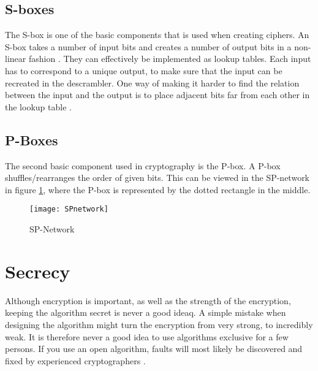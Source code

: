 \subsection{S-boxes}
The S-box is one of the basic components that is used when creating ciphers. 
An S-box takes a number of input bits and creates a number of output bits in 
a non-linear fashion \citep[pp. 74--75]{Stinson:2006}. They can effectively be 
implemented as lookup tables. Each input has to correspond to a unique output, 
to make sure that the input can be recreated in the descrambler. One way of 
making it harder to find the relation between the input and the output is to 
place adjacent bits far from each other in the lookup table
. 


\subsection{P-Boxes}
The second basic component used in cryptography is the P-box. A P-box 
shuffles/rearranges the order of given bits. This can be viewed in the 
SP-network in figure \ref{img:SPNetwork}, where the P-box is represented by the 
dotted rectangle in the middle.

\begin{figure}
  \begin{center}
    \texttt{[image: SPnetwork]}
    \caption{SP-Network}
    \label{img:SPNetwork}
  \end{center}
\end{figure}


\section{Secrecy}
Although encryption is important, as well as the strength of the encryption, 
keeping the algorithm secret is never a good ideaq. A simple mistake when 
designing the algorithm might turn the encryption from very strong, to 
incredibly weak. It is therefore never a good idea to use algorithms exclusive 
for a few persons. If you use an open algorithm, faults will most likely be 
discovered and fixed by experienced cryptographers \citep[pp. 23]{Schneier:2003}.
